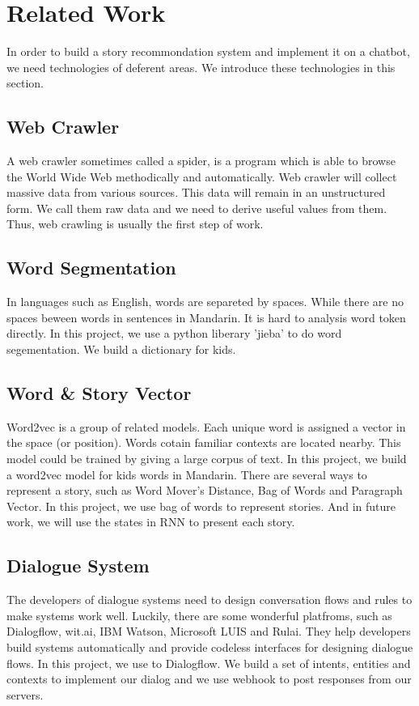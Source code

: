 \documentclass[twoside,twocolumn]{article}
\begin{document}

\section{Related Work}
In order to build a story recommondation system and implement it on a chatbot, we need technologies of deferent areas. We introduce these technologies in this section.

\subsection{Web Crawler}
A web crawler sometimes called a spider, is a program which is able to browse the World Wide Web methodically and automatically\cite{10}. Web crawler will collect massive data from various sources. This data will remain in an unstructured form. We call them raw data and we need to derive useful values from them. Thus,  web crawling is usually the first step of work.

\subsection{Word Segmentation}
In languages such as English, words are separeted by spaces. While there are no spaces beween words in sentences in Mandarin. It is hard to analysis word token directly. In this project, we use a python liberary 'jieba' to do word segementation. We build a  dictionary for kids. 

\subsection{Word \& Story Vector}
Word2vec is a group of related models. Each unique word is assigned a vector in the space (or position). Words cotain familiar contexts are located nearby\cite{11}. This model could be trained by giving a large corpus of text. In this project, we build a word2vec model for kids words in Mandarin.
There are several ways to represent a story, such as Word Mover’s Distance\cite{12}, Bag of Words and Paragraph Vector\cite{13}. In this project, we use bag of words to represent stories. And in future work, we will use the states in RNN to present each story.

\subsection{Dialogue System}
The developers of dialogue systems need to design conversation flows and rules to make systems work well\cite{14}. Luckily, there are some wonderful platfroms, such as Dialogflow, wit.ai, IBM Watson, Microsoft LUIS and Rulai. They help developers build systems automatically and provide codeless interfaces for designing dialogue flows\cite{15}. In this project, we use to Dialogflow. We build a set of intents, entities and contexts to implement our dialog and we use webhook to post responses from our servers.
\end{document}
